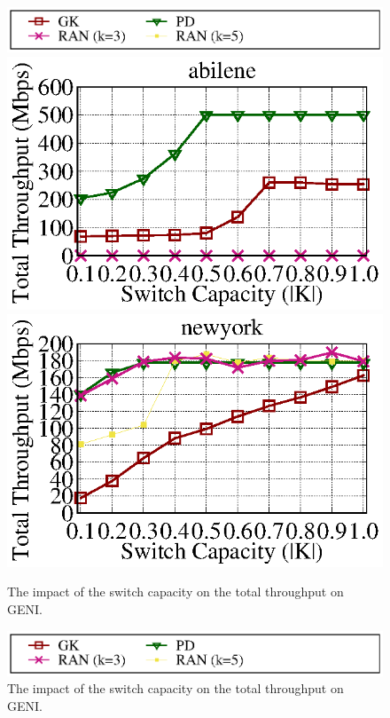 \documentclass[a4paper,12pt]{report}
\begin{document}
\begin{large}
    \begin{figure}[ht]
    \caption{The impact of the switch capacity on the total throughput on GENI.}
	\centering
	  \includegraphics[width=1.0\textwidth]{lambda_legend.eps}
	  \includegraphics[width=1.0\textwidth]{abilene_geni_throughput_e05.eps}
	  \includegraphics[width=1.0\textwidth]{newyork_geni_throughput_e05.eps}
  \end{figure}
    \begin{figure}[ht]
    \caption{The impact of the switch capacity on the total throughput on GENI.}
	\centering
	  \includegraphics[width=1.0\textwidth]{lambda_legend.eps}

\end{figure}
\end{large}
\end{document}
